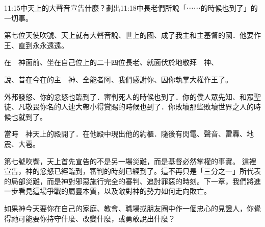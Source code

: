\begin{ScriptureBox2}{11:15中天上的大聲音宣告什麼？劃出11:18中長老們所說「⋯⋯的時候也到了」的一切事。}

\item[11:15] 第七位天使吹號、天上就有大聲音說、世上的國、成了我主和主基督的國．他要作王、直到永永遠遠。

\item[11:16] 在　神面前、坐在自己位上的二十四位長老、就面伏於地敬拜　神、

\item[11:17] 說、昔在今在的主　神、全能者阿、我們感謝你、因你執掌大權作王了。

\item[11:18] 外邦發怒、你的忿怒也臨到了．審判死人的時候也到了．你的僕人眾先知、和眾聖徒、凡敬畏你名的人連大帶小得賞賜的時候也到了．你敗壞那些敗壞世界之人的時候也就到了。

\item[11:19] 當時　神天上的殿開了．在他殿中現出他的約櫃．隨後有閃電、聲音、雷轟、地震、大雹。

\end{ScriptureBox2}

第七號吹響，天上首先宣告的不是另一場災難，而是基督必然掌權的事實。
這裡宣告，神的忿怒已經臨到，審判的時刻已經到了。這不再只是「三分之一」所代表的局部災難，而是神對邪惡施行完全的審判、追討罪惡的時刻。下一章，我們將進一步看見這場爭戰的屬靈本質，以及敵對神的勢力如何走向敗亡。

\begin{ReaderQuestion}
如果神今天要你在自己的家庭、教會、職場或朋友圈中作一個忠心的見證人，你覺得祂可能要你持守什麼、改變什麼，或勇敢說出什麼？
\end{ReaderQuestion}
